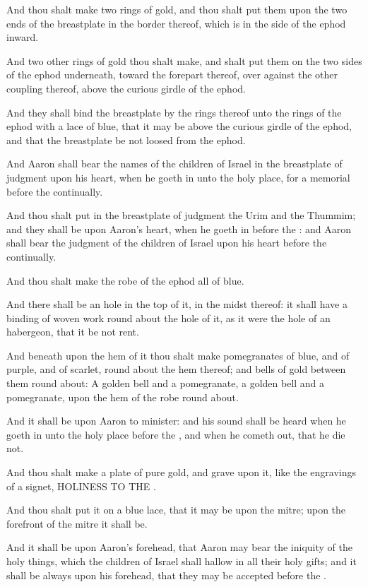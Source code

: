 \verse And thou shalt make two rings of gold, and thou shalt put them upon the two ends of the breastplate in the border thereof, which is in the side of the ephod inward.

\verse And two other rings of gold thou shalt make, and shalt put them on the two sides of the ephod underneath, toward the forepart thereof, over against the other coupling thereof, above the curious girdle of the ephod.

\verse And they shall bind the breastplate by the rings thereof unto the rings of the ephod with a lace of blue, that it may be above the curious girdle of the ephod, and that the breastplate be not loosed from the ephod.

\verse And Aaron shall bear the names of the children of Israel in the breastplate of judgment upon his heart, when he goeth in unto the holy place, for a memorial before the \LORD continually.

\verse And thou shalt put in the breastplate of judgment the Urim and the Thummim; and they shall be upon Aaron's heart, when he goeth in before the \LORD: and Aaron shall bear the judgment of the children of Israel upon his heart before the \LORD continually.

\verse And thou shalt make the robe of the ephod all of blue.

\verse And there shall be an hole in the top of it, in the midst thereof: it shall have a binding of woven work round about the hole of it, as it were the hole of an habergeon, that it be not rent.

\verse And beneath upon the hem of it thou shalt make pomegranates of blue, and of purple, and of scarlet, round about the hem thereof; and bells of gold between them round about: \verse A golden bell and a pomegranate, a golden bell and a pomegranate, upon the hem of the robe round about.

\verse And it shall be upon Aaron to minister: and his sound shall be heard when he goeth in unto the holy place before the \LORD, and when he cometh out, that he die not.

\verse And thou shalt make a plate of pure gold, and grave upon it, like the engravings of a signet, HOLINESS TO THE \LORD.

\verse And thou shalt put it on a blue lace, that it may be upon the mitre; upon the forefront of the mitre it shall be.

\verse And it shall be upon Aaron's forehead, that Aaron may bear the iniquity of the holy things, which the children of Israel shall hallow in all their holy gifts; and it shall be always upon his forehead, that they may be accepted before the \LORD.

